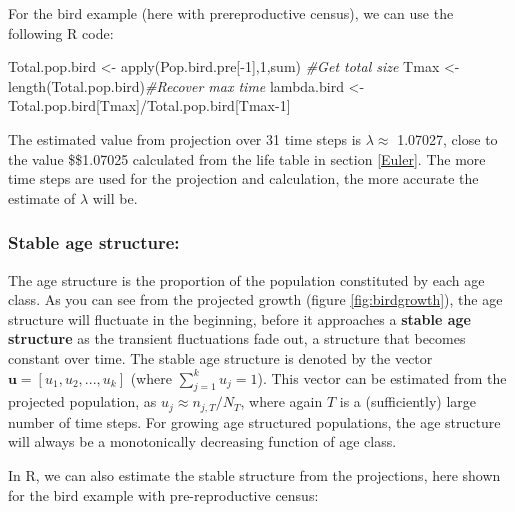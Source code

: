 \documentclass[
]{book}
\newenvironment{Shaded}{\begin{snugshade}}{\end{snugshade}}
\newcommand{\CommentTok}[1]{\textcolor[rgb]{0.56,0.35,0.01}{\textit{#1}}}
\newcommand{\DecValTok}[1]{\textcolor[rgb]{0.00,0.00,0.81}{#1}}
\newcommand{\FunctionTok}[1]{\textcolor[rgb]{0.00,0.00,0.00}{#1}}
\newcommand{\NormalTok}[1]{#1}
\newcommand{\OtherTok}[1]{\textcolor[rgb]{0.56,0.35,0.01}{#1}}
\newcommand{\SpecialCharTok}[1]{\textcolor[rgb]{0.00,0.00,0.00}{#1}}
\begin{document}
For the bird example (here with prereproductive census), we can use the following R code:

\begin{Shaded}
\begin{Highlighting}[]
\NormalTok{Total.pop.bird }\OtherTok{\textless{}{-}} \FunctionTok{apply}\NormalTok{(Pop.bird.pre[}\SpecialCharTok{{-}}\DecValTok{1}\NormalTok{],}\DecValTok{1}\NormalTok{,sum) }\CommentTok{\#Get total size}
\NormalTok{Tmax }\OtherTok{\textless{}{-}} \FunctionTok{length}\NormalTok{(Total.pop.bird)}\CommentTok{\#Recover max time}
\NormalTok{lambda.bird }\OtherTok{\textless{}{-}}\NormalTok{ Total.pop.bird[Tmax]}\SpecialCharTok{/}\NormalTok{Total.pop.bird[Tmax}\DecValTok{{-}1}\NormalTok{]}
\end{Highlighting}
\end{Shaded}

The estimated value from projection over 31 time steps is \(\lambda\approx\) 1.07027, close to the value \$\lambda\approx\$1.07025 calculated from the life table in section \ref{Euler}. The more time steps are used for the projection and calculation, the more accurate the estimate of \(\lambda\) will be.

\hypertarget{stable-age-structure}{%
\subsubsection*{Stable age structure:}\label{stable-age-structure}}

The age structure is the proportion of the population constituted by each age class. As you can see from the projected growth (figure \ref{fig:birdgrowth}), the age structure will fluctuate in the beginning, before it approaches a \textbf{stable age structure} as the transient fluctuations fade out, a structure that becomes constant over time. The stable age structure is denoted by the vector \(\mathbf{u}=[u_1, u_2, ..., u_k]\) (where \(\sum_{j=1}^{k} u_j=1\)). This vector can be estimated from the projected population, as \(u_j\approx n_{j,T}/N_T\), where again \(T\) is a (sufficiently) large number of time steps. For growing age structured populations, the age structure will always be a monotonically decreasing function of age class.

In R, we can also estimate the stable structure from the projections, here shown for the bird example with pre-reproductive census:
\end{document}

